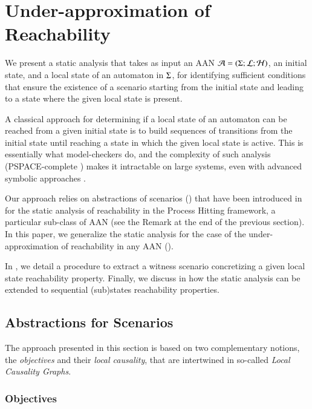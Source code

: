 \section{Under-approximation of Reachability}\label{sec:sa}

We present a static analysis that takes as input an AAN
$\mathcal{A} = (\Sigma; \mathcal{L}; \mathcal{H})$,
an initial state, and a local state of an automaton in $\Sigma$, for identifying sufficient conditions
that ensure the existence of a scenario starting from the initial state and leading to a state
where the given local state is present.

A classical approach for determining if a local state of an automaton can be
reached from a given initial state is to build sequences of transitions from the initial state
until reaching a state in which the given local state is active.
This is essentially what model-checkers do, and the complexity of such analysis (PSPACE-complete
\cite{Harel02}) makes it intractable on large systems, even with advanced symbolic approaches
\cite{PMR12-MSCS}.

Our approach relies on abstractions of scenarios () that have been introduced in
\cite{PMR12-MSCS} for the static analysis of reachability in the Process Hitting framework,
a particular sub-class of AAN (see the Remark at the end of the previous section).
In this paper, we generalize the static analysis for the case of the under-approximation of
reachability in any AAN ().

In , we detail a procedure to extract a witness scenario
concretizing a given local state reachability property.
Finally, we discuss in  how the static analysis can be
extended to sequential (sub)states reachability properties.


\subsection{Abstractions for Scenarios}
\label{ssec:abstr-sce}

The approach presented in this section is based on two complementary notions,
the \emph{objectives} and their \emph{local causality},
that are intertwined in so-called \emph{Local Causality Graphs}.

\subsubsection{Objectives}

